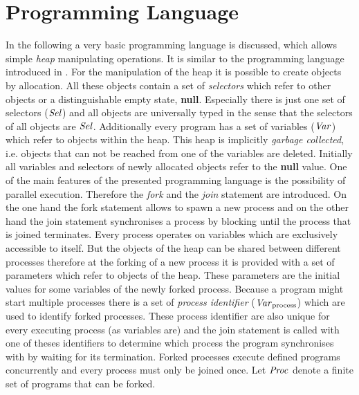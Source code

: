 \section{Programming Language}
	\label{sec:ProgLang}
	In the following a very basic programming language is discussed, which
	allows simple \emph{heap} manipulating operations. It is similar to the
	programming language introduced in \cite{fmsd}. For the manipulation of the
	heap it is possible to create objects by allocation. All these objects
	contain a set of \emph{selectors} which refer to other objects or a
	distinguishable empty state, \textbf{null}. Especially
	there is just one set of selectors ($\mathit{Sel}$) and all objects are universally
	typed in the sense that the selectors of all objects are $\mathit{Sel}$.
	Additionally every program has a set of variables ($\mathit{Var}$) which refer to
	objects within the heap. This heap is implicitly \emph{garbage collected},
	i.e. objects that can not be reached from one of the variables are
	deleted. Initially all variables and selectors of newly allocated objects
	refer to the \textbf{null} value.
	One of the main features of the presented programming
	language is the possibility of parallel execution. Therefore the \emph{fork}
	and the \emph{join} statement are introduced. On the one hand the fork
	statement allows to spawn a new process and on the other hand the join
	statement synchronises a process by blocking until the process that is
	joined terminates.
	Every process operates on variables which are exclusively accessible to
	itself.  But the objects of the heap can be shared between different
	processes therefore at the forking of a new process it is provided with a
	set of parameters which refer to objects of the heap. These parameters are
	the initial values for some variables of the newly forked process. Because a
	program might start multiple processes there is a set of \emph{process
	identifier} ($\mathit{Var}_{\text{process}}$) which are used to identify forked processes. These
	process identifier are also unique for every executing process (as variables
	are) and the join statement is called with one of theses identifiers to
	determine which process the program synchronises with by waiting for its
	termination. Forked processes execute defined programs concurrently and
	every process must only be joined once.
	Let $\mathit{Proc}$ denote a finite set of programs that can be forked.
